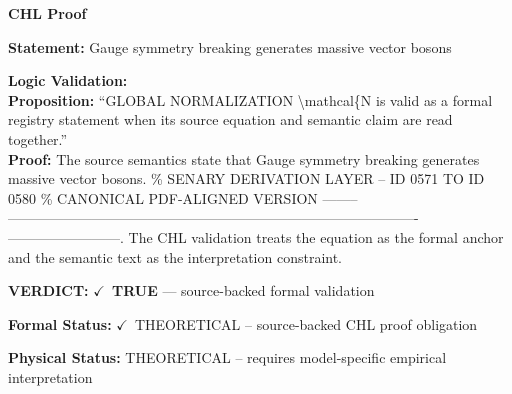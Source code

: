 \vspace{0.45em}
\noindent\textbf{CHL Proof}\par
\textbf{Statement:} Gauge symmetry breaking generates massive vector bosons

\textbf{Logic Validation:}\\
\textbf{Proposition:} ``GLOBAL NORMALIZATION \textbackslash{}mathcal\{N is valid as a formal registry statement when its source
equation and semantic claim are read together.''\\
\textbf{Proof:} The source semantics state that Gauge symmetry breaking generates massive vector bosons.
\% SENARY DERIVATION LAYER -- ID 0571 TO ID 0580 \% CANONICAL PDF-ALIGNED VERSION --------
----------------------------------------------------------------------------------------
------------------------. The CHL validation treats the equation as the formal anchor
and the semantic text as the interpretation constraint.

\textbf{VERDICT:} \ensuremath{\checkmark}\ \textbf{TRUE} --- source-backed formal validation

\textbf{Formal Status:} \ensuremath{\checkmark}\ THEORETICAL -- source-backed CHL proof obligation

\textbf{Physical Status:} THEORETICAL -- requires model-specific empirical interpretation
\par\vspace{0.45em}
\par
\ifTZPDarkEdition
{}
\fi
\endgroup
\endgroup
